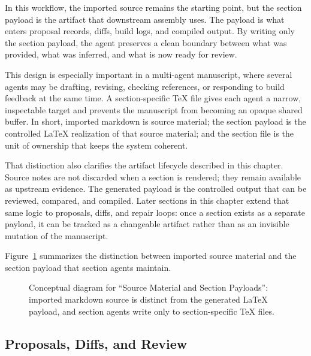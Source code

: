 \documentclass[11pt]{article}
\begin{document}
In this workflow, the imported source remains the starting point, but the section payload is the artifact that downstream assembly uses. The payload is what enters proposal records, diffs, build logs, and compiled output. By writing only the section payload, the agent preserves a clean boundary between what was provided, what was inferred, and what is now ready for review.

This design is especially important in a multi-agent manuscript, where several agents may be drafting, revising, checking references, or responding to build feedback at the same time. A section-specific TeX file gives each agent a narrow, inspectable target and prevents the manuscript from becoming an opaque shared buffer. In short, imported markdown is source material; the section payload is the controlled \LaTeX{} realization of that source material; and the section file is the unit of ownership that keeps the system coherent.

That distinction also clarifies the artifact lifecycle described in this chapter. Source notes are not discarded when a section is rendered; they remain available as upstream evidence. The generated payload is the controlled output that can be reviewed, compared, and compiled. Later sections in this chapter extend that same logic to proposals, diffs, and repair loops: once a section exists as a separate payload, it can be tracked as a changeable artifact rather than as an invisible mutation of the manuscript.

Figure~\ref{fig:ch07_sec01_section_payloads} summarizes the distinction between imported source material and the section payload that section agents maintain.

\begin{figure}[htbp]
\centering

\caption{Conceptual diagram for ``Source Material and Section Payloads'': imported markdown source is distinct from the generated \LaTeX{} payload, and section agents write only to section-specific TeX files.}
\label{fig:ch07_sec01_section_payloads}
\end{figure}



\subsection{Proposals, Diffs, and Review}

\end{document}
